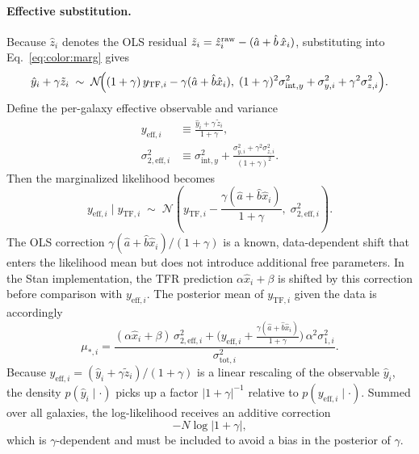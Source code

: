 \paragraph{Effective substitution.}
Because $\hat{z}_i$ denotes the OLS residual $\tilde{z}_i = \hat{z}_i^{\rm raw} - (\hat{a} + \hat{b}\,\hat{x}_i)$,
substituting into Eq.~\eqref{eq:color:marg} gives
\begin{equation}
\hat{y}_i + \gamma\tilde{z}_i
\;\sim\;
\mathcal{N}\!\Bigl((1+\gamma)\,y_{\mathrm{TF},i} - \gamma(\hat{a}+\hat{b}\hat{x}_i),\;
(1+\gamma)^2\sigma_{\mathrm{int},y}^2 + \sigma_{y,i}^2 + \gamma^2\sigma_{z,i}^2\Bigr).
\end{equation}
Define the per-galaxy effective observable and variance
\begin{align}
y_{\mathrm{eff},i} &\equiv \frac{\hat{y}_i + \gamma\,\tilde{z}_i}{1+\gamma},
\label{eq:color:yeff}\\
\sigma_{2,\mathrm{eff},i}^2 &\equiv \sigma_{\mathrm{int},y}^2
  + \frac{\sigma_{y,i}^2 + \gamma^2\sigma_{z,i}^2}{(1+\gamma)^2}.
\label{eq:color:s2eff}
\end{align}
Then the marginalized likelihood becomes
\begin{equation}
y_{\mathrm{eff},i} \mid y_{\mathrm{TF},i}
\;\sim\;
\mathcal{N}\!\left(y_{\mathrm{TF},i} - \frac{\gamma(\hat{a}+\hat{b}\hat{x}_i)}{1+\gamma},\;\sigma_{2,\mathrm{eff},i}^2\right).
\label{eq:color:reduced}
\end{equation}
The OLS correction $\gamma(\hat{a}+\hat{b}\hat{x}_i)/(1+\gamma)$ is a known,
data-dependent shift that enters the likelihood mean but does not introduce
additional free parameters.
In the Stan implementation, the TFR prediction $\alpha\hat{x}_i + \beta$
is shifted by this correction before comparison with $y_{\mathrm{eff},i}$.
The posterior mean of $y_{\mathrm{TF},i}$ given the data is accordingly
\begin{equation}
\mu_{*,i} = \frac{(\alpha\hat{x}_i+\beta)\,\sigma_{2,\mathrm{eff},i}^2
  + \bigl(y_{\mathrm{eff},i} + \tfrac{\gamma(\hat{a}+\hat{b}\hat{x}_i)}{1+\gamma}\bigr)\,\alpha^2\sigma_{1,i}^2}
  {\sigma_{\mathrm{tot},i}^2}.
\label{eq:color:mustar}
\end{equation}
Because $y_{\mathrm{eff},i} = (\hat{y}_i + \gamma\tilde{z}_i)/(1+\gamma)$
is a linear rescaling of the observable $\hat{y}_i$, the density
$p(\hat{y}_i\mid\cdot)$ picks up a factor $|1+\gamma|^{-1}$ relative to
$p(y_{\mathrm{eff},i}\mid\cdot)$.
Summed over all galaxies, the log-likelihood receives an additive correction
\begin{equation}
  -N\log|1+\gamma|,
\label{eq:color:jacobian}
\end{equation}
which is $\gamma$-dependent and must be included to avoid a bias in the
posterior of $\gamma$.

